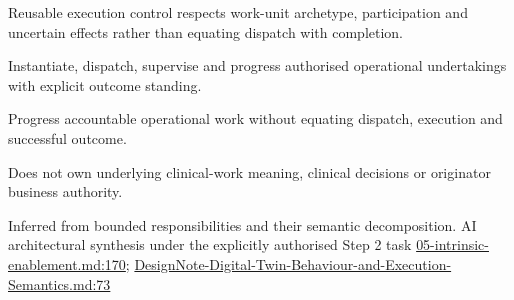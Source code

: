 Reusable execution control respects work-unit archetype, participation and uncertain effects rather than equating dispatch with completion.



Instantiate, dispatch, supervise and progress authorised operational undertakings with explicit outcome standing.



Progress accountable operational work without equating dispatch, execution and successful outcome.



Does not own underlying clinical-work meaning, clinical decisions or originator business authority.


Inferred from bounded responsibilities and their semantic decomposition. AI architectural synthesis under the explicitly authorised Step 2 task \hyperref[evidence:d70bf9b0b197558f]{05-intrinsic-enablement.md:170}; \hyperref[evidence:ec6250f7cf7c29a5]{DesignNote-Digital-Twin-Behaviour-and-Execution-Semantics.md:73}
